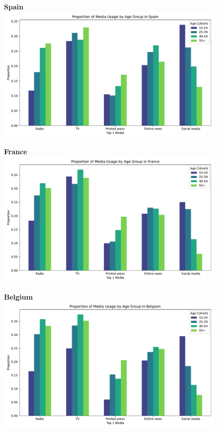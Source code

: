 \documentclass[12pt]{article}
\begin{document}
	\begin{figure}[h!]
	\centering
	\begin{minipage}[b]{0.45\textwidth}
		\centering
		\textbf{ Spain}
		\includegraphics[width=\textwidth]{figures/media_es}
	\end{minipage}
	\hfill
	\begin{minipage}[b]{0.45\textwidth}
		\centering
		\textbf{ France}
		\includegraphics[width=\textwidth]{figures/media_fr}
	\end{minipage}
	\vfill
	\begin{minipage}[b]{0.45\textwidth}
		\centering
		\textbf{ Belgium}
		\includegraphics[width=\textwidth]{figures/media_be}

\end{minipage}
\end{figure}
\end{document}

